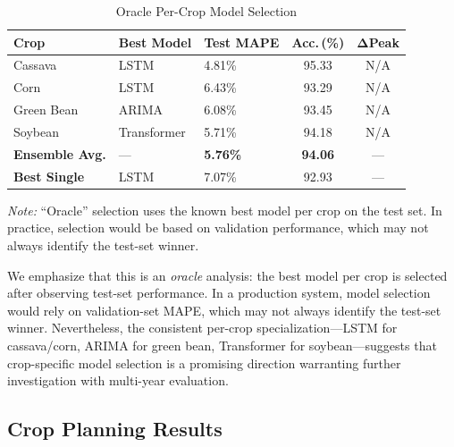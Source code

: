 \documentclass[journal]{IEEEtran}
\begin{document}
\begin{table}[htbp]
  \centering
  \caption{Oracle Per-Crop Model Selection}
  \label{tab:ensemble}
  \begin{tabular}{lllcc}
    \toprule
    \textbf{Crop} & \textbf{Best Model} & \textbf{Test MAPE} & \textbf{Acc.\,(\%)} & $\boldsymbol{\Delta}$\textbf{Peak} \\
    \midrule
    Cassava    & LSTM        & 4.81\%  & 95.33 & N/A \\
    Corn       & LSTM        & 6.43\%  & 93.29 & N/A \\
    Green Bean & ARIMA       & 6.08\%  & 93.45 & N/A \\
    Soybean    & Transformer & 5.71\%  & 94.18 & N/A \\
    \midrule
    \textbf{Ensemble Avg.} & --- & \textbf{5.76\%} & \textbf{94.06} & --- \\
    \textbf{Best Single}   & LSTM & 7.07\% & 92.93 & --- \\
    \bottomrule
  \end{tabular}
  \vspace{6pt}
  \par\raggedright\scriptsize\textit{Note:} ``Oracle'' selection uses the known best model per crop on the test set. In practice, selection would be based on validation performance, which may not always identify the test-set winner.
\end{table}

We emphasize that this is an \textit{oracle} analysis: the best model per crop is selected after observing test-set performance. In a production system, model selection would rely on validation-set MAPE, which may not always identify the test-set winner. Nevertheless, the consistent per-crop specialization---LSTM for cassava/corn, ARIMA for green bean, Transformer for soybean---suggests that crop-specific model selection is a promising direction warranting further investigation with multi-year evaluation.

\subsection{Crop Planning Results}
\end{document}
